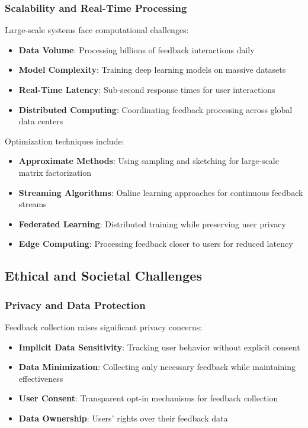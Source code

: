 \subsubsection{Scalability and Real-Time Processing}

Large-scale systems face computational challenges:

\begin{itemize}
    \item \textbf{Data Volume}: Processing billions of feedback interactions daily
    \item \textbf{Model Complexity}: Training deep learning models on massive datasets
    \item \textbf{Real-Time Latency}: Sub-second response times for user interactions
    \item \textbf{Distributed Computing}: Coordinating feedback processing across global data centers
\end{itemize}

Optimization techniques include:
\begin{itemize}
    \item \textbf{Approximate Methods}: Using sampling and sketching for large-scale matrix factorization
    \item \textbf{Streaming Algorithms}: Online learning approaches for continuous feedback streams
    \item \textbf{Federated Learning}: Distributed training while preserving user privacy
    \item \textbf{Edge Computing}: Processing feedback closer to users for reduced latency
\end{itemize}

\subsection{Ethical and Societal Challenges}

\subsubsection{Privacy and Data Protection}

Feedback collection raises significant privacy concerns:

\begin{itemize}
    \item \textbf{Implicit Data Sensitivity}: Tracking user behavior without explicit consent
    \item \textbf{Data Minimization}: Collecting only necessary feedback while maintaining effectiveness
    \item \textbf{User Consent}: Transparent opt-in mechanisms for feedback collection
    \item \textbf{Data Ownership}: Users' rights over their feedback data
\end{itemize}

